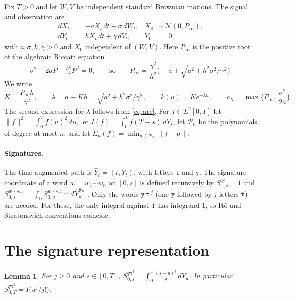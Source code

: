 \documentclass[11pt]{article}
\newtheorem{lemma}[theorem]{Lemma}
\theoremstyle{remark}
\newcommand{\Sig}{S}
\newcommand{\wy}{\mathtt y}
\newcommand{\wt}{\mathtt t}
\begin{document}
Fix $T>0$ and let $W,V$ be independent standard Brownian motions. The signal and observation are
\begin{align}
  dX_t &= -aX_t\,dt + \sigma\,dW_t, & X_0 &\sim \mathcal N(0,P_\infty),\label{eq:signal}\\
  dY_t &= hX_t\,dt + \gamma\,dV_t, & Y_0 &= 0,\label{eq:obs}
\end{align}
with $a,\sigma,h,\gamma>0$ and $X_0$ independent of $(W,V)$. Here $P_\infty$ is the positive root of the
algebraic Riccati equation
\begin{equation}\label{eq:are}
  \sigma^2 - 2aP - \tfrac{h^2}{\gamma^2}P^2 = 0,
  \qquad\text{so}\qquad
  P_\infty = \frac{\gamma^2}{h^2}\Big(\!-a+\sqrt{a^2+h^2\sigma^2/\gamma^2}\Big).
\end{equation}
We write
\[
  K=\frac{P_\infty h}{\gamma^2},\qquad \lambda = a+Kh=\sqrt{a^2+h^2\sigma^2/\gamma^2},\qquad
  k(u)=Ke^{-\lambda u},\qquad c_X=\max\Big\{P_\infty,\ \frac{\sigma^2}{2a}\Big\}.
\]
The second expression for $\lambda$ follows from \eqref{eq:are}.
For $f\in L^2[0,T]$ let $\|f\|^2=\int_0^T f(u)^2\,du$, let
$I(f)=\int_0^T f(T-s)\,dY_s$, let $\mathcal P_n$ be the polynomials of degree at most $n$, and let
$E_n(f)=\min_{p\in\mathcal P_n}\|f-p\|$.

\paragraph{Signatures.} The time-augmented path is $\hat Y_t=(t,Y_t)$, with letters $\wt$ and $\wy$.
The signature coordinate of a word $w=w_1\cdots w_n$ on $[0,s]$ is defined recursively by
$\Sig^{\varnothing}_{0,s}=1$ and
$\Sig^{w_1\cdots w_n}_{0,s}=\int_0^s \Sig^{w_1\cdots w_{n-1}}_{0,u}\,d\hat Y^{w_n}_u$
\citep{lyons1998}. Only the words $\wy\,\wt^{\,j}$ (one $\wy$ followed by $j$ letters $\wt$) are needed.
For these, the only integral against $Y$ has integrand $1$, so It\^o and Stratonovich
conventions coincide.

\section{The signature representation}

\begin{lemma}\label{lem:words}
For $j\ge0$ and $s\in[0,T]$,
$\displaystyle \Sig^{\wy\wt^{j}}_{0,s}=\int_0^s\frac{(s-u)^j}{j!}\,dY_u$. In particular
$\Sig^{\wy\wt^{j}}_{0,T}=I\big(u^j/j!\big)$.
\end{lemma}
\end{document}
